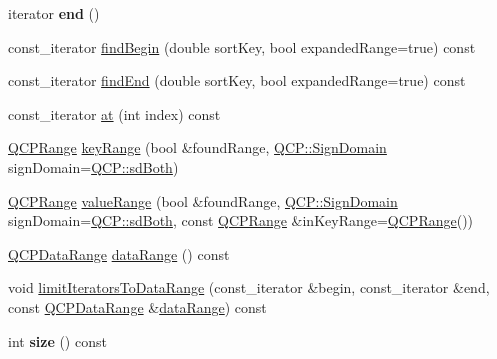 \begin{DoxyCompactItemize}
\item 
iterator {\bfseries end} ()\hypertarget{class_q_c_p_data_container_a3c7d450cdad10302e6102f7fe064223c}{}\label{class_q_c_p_data_container_a3c7d450cdad10302e6102f7fe064223c}

\item 
const\+\_\+iterator \hyperlink{class_q_c_p_data_container_a8ffcab551fd06dd037874ef644c73467}{find\+Begin} (double sort\+Key, bool expanded\+Range=true) const 
\item 
const\+\_\+iterator \hyperlink{class_q_c_p_data_container_ad9b6b0343252eb3bbd591ee28aaa4e9d}{find\+End} (double sort\+Key, bool expanded\+Range=true) const 
\item 
const\+\_\+iterator \hyperlink{class_q_c_p_data_container_a6e92717af67e5e93a80f1f44ce040c74}{at} (int index) const 
\item 
\hyperlink{class_q_c_p_range}{Q\+C\+P\+Range} \hyperlink{class_q_c_p_data_container_aba6e1a93c21ccc56a432b4a02c9d0ed2}{key\+Range} (bool \&found\+Range, \hyperlink{namespace_q_c_p_afd50e7cf431af385614987d8553ff8a9}{Q\+C\+P\+::\+Sign\+Domain} sign\+Domain=\hyperlink{namespace_q_c_p_afd50e7cf431af385614987d8553ff8a9a3dee7e9cd2fedce9253b83e172626a6c}{Q\+C\+P\+::sd\+Both})
\item 
\hyperlink{class_q_c_p_range}{Q\+C\+P\+Range} \hyperlink{class_q_c_p_data_container_a35a102dc2424d1228fc374d9313efbe9}{value\+Range} (bool \&found\+Range, \hyperlink{namespace_q_c_p_afd50e7cf431af385614987d8553ff8a9}{Q\+C\+P\+::\+Sign\+Domain} sign\+Domain=\hyperlink{namespace_q_c_p_afd50e7cf431af385614987d8553ff8a9a3dee7e9cd2fedce9253b83e172626a6c}{Q\+C\+P\+::sd\+Both}, const \hyperlink{class_q_c_p_range}{Q\+C\+P\+Range} \&in\+Key\+Range=\hyperlink{class_q_c_p_range}{Q\+C\+P\+Range}())
\item 
\hyperlink{class_q_c_p_data_range}{Q\+C\+P\+Data\+Range} \hyperlink{class_q_c_p_data_container_a0aa30487aa557b38c2e10f918454c085}{data\+Range} () const 
\item 
void \hyperlink{class_q_c_p_data_container_ad55f9e9c95ab4414b477d2f08ffd9bd7}{limit\+Iterators\+To\+Data\+Range} (const\+\_\+iterator \&begin, const\+\_\+iterator \&end, const \hyperlink{class_q_c_p_data_range}{Q\+C\+P\+Data\+Range} \&\hyperlink{class_q_c_p_data_container_a0aa30487aa557b38c2e10f918454c085}{data\+Range}) const 
\item 
int {\bfseries size} () const \hypertarget{class_q_c_p_data_container_a09003591d8812dea7a548c500b62750a}{}\label{class_q_c_p_data_container_a09003591d8812dea7a548c500b62750a}


\end{DoxyCompactItemize}
